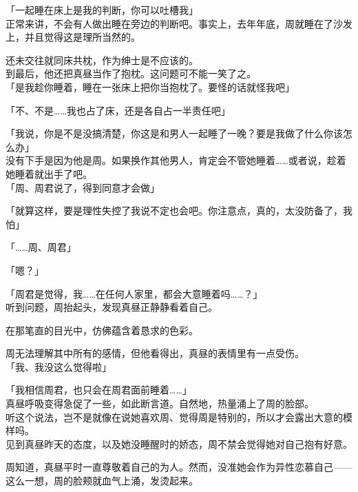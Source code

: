 「一起睡在床上是我的判断，你可以吐槽我」\\

正常来讲，不会有人做出睡在旁边的判断吧。事实上，去年年底，周就睡在了沙发上，并且觉得这是理所当然的。

还未交往就同床共枕，作为绅士是不应该的。\\

到最后，他还把真昼当作了抱枕。这问题可不能一笑了之。\\

「是我趁你睡着，睡在一张床上把你当抱枕了。要怪的话就怪我吧」

「不、不是……我也占了床，还是各自占一半责任吧」

「我说，你是不是没搞清楚，你这是和男人一起睡了一晚？要是我做了什么你该怎么办」\\

没有下手是因为他是周。如果换作其他男人，肯定会不管她睡着……或者说，趁着她睡着就出手了吧。\\

「周、周君说了，得到同意才会做」

「就算这样，要是理性失控了我说不定也会吧。你注意点，真的，太没防备了，我怕」

「……周、周君」

「嗯？」

「周君是觉得，我……在任何人家里，都会大意睡着吗……？」\\

听到问题，周抬起头，发现真昼正静静看着自己。

在那笔直的目光中，仿佛蕴含着恳求的色彩。

周无法理解其中所有的感情，但他看得出，真昼的表情里有一点受伤。\\

「我、我没这么觉得啦」

「我相信周君，也只会在周君面前睡着……」\\

真昼呼吸变得急促了一些，如此断言道。自然地，热量涌上了周的脸部。\\

听这个说法，岂不是就像在说她喜欢周、觉得周是特别的，所以才会露出大意的模样吗。\\

见到真昼昨天的态度，以及她没睡醒时的娇态，周不禁会觉得她对自己抱有好意。

周知道，真昼平时一直尊敬着自己的为人。然而，没准她会作为异性恋慕自己——这么一想，周的脸颊就血气上涌，发烫起来。\\

